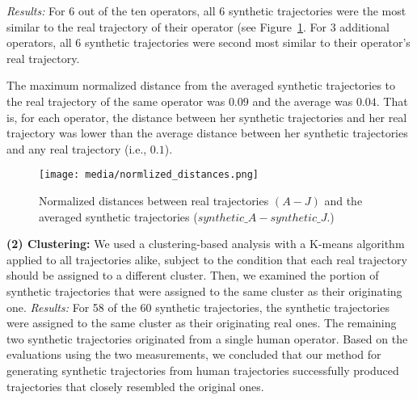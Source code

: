 \textit{Results:}
For $6$ out of the ten operators, all $6$ synthetic trajectories were the most similar to the real trajectory of their operator (see Figure~\ref{fig:normlized_distances_paper}.
For $3$ additional operators, all $6$ synthetic trajectories were second most similar to their operator's real trajectory.
 
The maximum normalized distance from the averaged synthetic trajectories to the real trajectory of the same operator was $0.09$ and the average was $0.04$. That is, for each operator, the distance between her synthetic trajectories and her real trajectory was lower than the average distance between her synthetic trajectories and any real trajectory (i.e., $0.1$). 
\begin{figure}[tbp]
    \centering
    \texttt{[image: media/normlized\_distances.png]}
    \vspace{-10pt}
    \caption{Normalized distances between real trajectories $(A-J)$ and the averaged synthetic trajectories ($synthetic\_A-synthetic\_J$.)}
    \label{fig:normlized_distances_paper}
\end{figure}

\noindent\textbf{(2) Clustering:} We used a clustering-based analysis with a K-means algorithm applied to all trajectories alike, subject to the condition that each real trajectory should be assigned to a different cluster. Then, we examined the portion of synthetic trajectories that were assigned to the same cluster as their originating one.   
\textit{Results:}
For 58 of the 60 synthetic trajectories, the synthetic trajectories were assigned to the same cluster as their originating real ones.  The remaining two synthetic trajectories originated from a single human operator.
Based on the evaluations using the two measurements, we concluded that our method for generating synthetic trajectories from human trajectories successfully produced trajectories that closely resembled the original ones.

